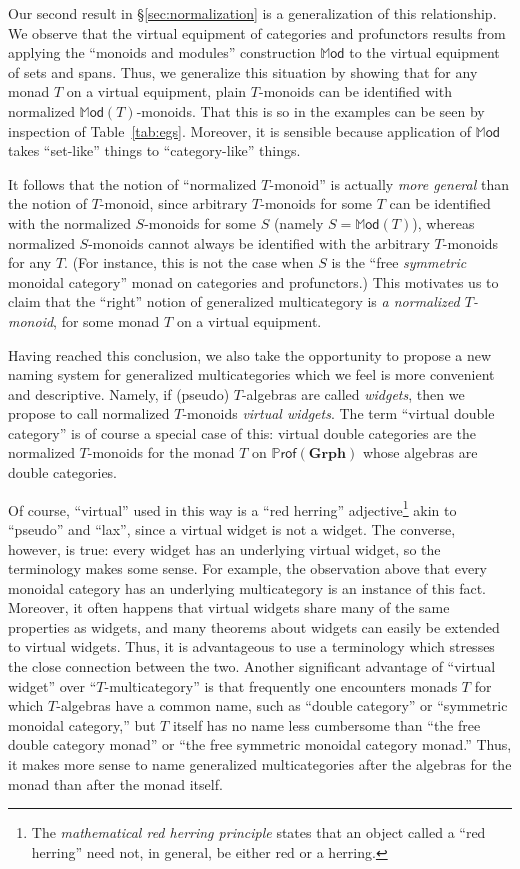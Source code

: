 \documentclass{tac}
\newcommand{\mb}[1]{{\mathbf{#1}}}
\newcommand{\iPROF}[1]{\mathbb{P}\mathsf{rof}(\mb{#1})}
\newcommand{\Mod}{\ensuremath{\mathbb{M}\mathsf{od}}}
\numberwithin{equation}{section}
\begin{document}
Our second result in \S\ref{sec:normalization} is a generalization of
this relationship.  We observe that the virtual equipment of categories
and profunctors results from applying the ``monoids and modules''
construction $\Mod$ to the virtual equipment of sets and spans.  Thus,
we generalize this situation by showing that for any monad $T$ on a
virtual equipment, plain $T$-monoids can be identified with normalized
$\Mod(T)$-monoids.  That this is so in the examples can be seen by
inspection of Table~\ref{tab:egs}.  Moreover, it is sensible because
application of $\Mod$ takes ``set-like'' things to ``category-like''
things.

It follows that the notion of ``normalized $T$-monoid'' is actually
\emph{more general} than the notion of $T$-monoid, since arbitrary
$T$-monoids for some $T$ can be identified with the normalized
$S$-monoids for some $S$ (namely $S=\Mod(T)$), whereas normalized
$S$-monoids cannot always be identified with the arbitrary $T$-monoids
for any $T$.  (For instance, this is not the case when $S$ is the ``free
\emph{symmetric} monoidal category'' monad on categories and
profunctors.)  This motivates us to claim that the ``right'' notion of
generalized multicategory is \emph{a normalized $T$-monoid}, for some
monad $T$ on a virtual equipment.

Having reached this conclusion, we also take the opportunity to propose
a new naming system for generalized multicategories which we feel is
more convenient and descriptive.  Namely, if (pseudo) $T$-algebras are
called \emph{widgets}, then we propose to call normalized $T$-monoids
\emph{virtual widgets}.  The term ``virtual double category'' is of
course a special case of this: virtual double categories are the
normalized $T$-monoids for the monad $T$ on $\iPROF{Grph}$ whose
algebras are double categories.

Of course, ``virtual'' used in this way is a ``red herring''
adjective\footnote{The \emph{mathematical red herring principle} states
  that an object called a ``red herring'' need not, in general, be
  either red or a herring.} akin to ``pseudo'' and ``lax'', since a
virtual widget is not a widget.  The converse, however, is true: every
widget has an underlying virtual widget, so the terminology makes some
sense. For example, the observation above that every monoidal category
has an underlying multicategory is an instance of this fact.  Moreover,
it often happens that virtual widgets share many of the same properties
as widgets, and many theorems about widgets can easily be extended to
virtual widgets.  Thus, it is advantageous to use a terminology which
stresses the close connection between the two.  Another significant
advantage of ``virtual widget'' over ``$T$-multicategory'' is that
frequently one encounters monads $T$ for which $T$-algebras have a
common name, such as ``double category'' or ``symmetric monoidal
category,'' but $T$ itself has no name less cumbersome than ``the free
double category monad'' or ``the free symmetric monoidal category
monad.''  Thus, it makes more sense to name generalized multicategories
after the algebras for the monad than after the monad itself.
\end{document}
